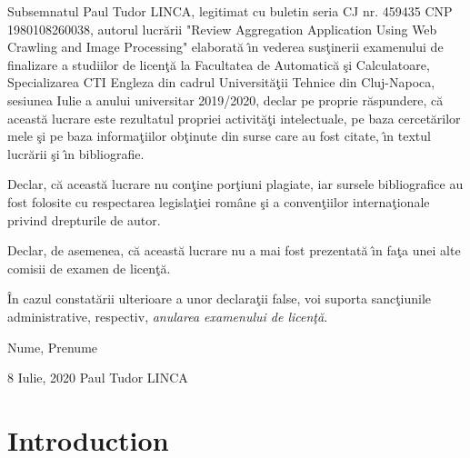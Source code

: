 \documentclass[12pt,a4paper,twoside]{report}
\renewcommand{\thesisauthor}{Paul Tudor LINCA}
\begin{document}
Subsemnatul \thesisauthor, legitimat cu buletin seria CJ nr. 459435 CNP 1980108260038, autorul lucr\u{a}rii "Review Aggregation Application Using Web Crawling and Image Processing" elaborat\u{a} \^{\i}n vederea sus\c{t}inerii examenului de finalizare a studiilor de licen\c{t}\u{a} la Facultatea de Automatic\u{a} \c{s}i Calculatoare, Specializarea CTI Engleza din cadrul Universit\u{a}\c{t}ii Tehnice din Cluj-Napoca, sesiunea Iulie a anului universitar 2019/2020, declar pe proprie r\u{a}spundere, c\u{a} aceast\u{a} lucrare este rezultatul propriei activit\u{a}\c{t}i intelectuale, pe baza cercet\u{a}rilor mele \c{s}i pe baza informa\c{t}iilor ob\c{t}inute din surse care au fost citate, \^{\i}n textul lucr\u{a}rii \c{s}i \^{\i}n bibliografie.

Declar, c\u{a} aceast\u{a} lucrare nu con\c{t}ine por\c{t}iuni plagiate, iar sursele bibliografice au fost folosite cu 
respectarea legisla\c{t}iei rom\^{a}ne \c{s}i a conven\c{t}iilor interna\c{t}ionale privind drepturile de autor.

Declar, de asemenea, c\u{a} aceast\u{a} lucrare nu a mai fost prezentat\u{a} \^{\i}n fa\c{t}a unei alte comisii de examen de licen\c{t}\u{a}.

\^{I}n cazul constat\u{a}rii ulterioare a unor declara\c{t}ii false, voi suporta sanc\c{t}iunile administrative, respectiv, \emph{anularea examenului de licen\c{t}\u{a}}.

\vspace{1.5cm}

\hspace{9cm} Nume, Prenume

\vspace{0.5cm}

8 Iulie, 2020 \hspace{6.5cm} \thesisauthor

\vspace{0.5cm}

\thispagestyle{empty}

\newpage

\setcounter{page}{1}

\newpage

\tableofcontents
\newpage

\setcounter{page}{1}

\chapter{Introduction}
\end{document}
